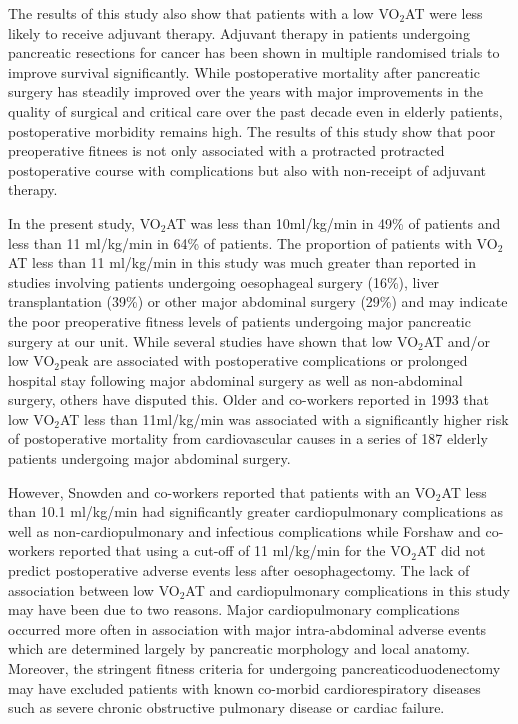 The results of this study also show that patients with a low VO$_2$AT were less likely to receive adjuvant therapy. Adjuvant therapy in patients undergoing pancreatic resections for cancer has been shown in multiple randomised trials to improve survival significantly.\parencite{neoptolemos_randomized_2004, neoptolemos_adjuvant_2009}
While postoperative mortality after pancreatic surgery has steadily improved over the years with major improvements in the quality of surgical and critical care over the past decade\parencite{winter_1423_2006} even in elderly patients\parencite{makary_pancreaticoduodenectomy_2006}, postoperative morbidity remains high.\parencite{mann_review_2010} The results of this study show that poor preoperative fitnees is not only associated with a protracted protracted postoperative course with complications but also with non-receipt of adjuvant therapy.

In the present study, VO$_2$AT was less than 10ml/kg/min in 49\% of patients and less than 11 ml/kg/min in 64\% of patients. The proportion of patients with VO$_2$AT less than 11 ml/kg/min in this study was much greater than reported in studies involving patients undergoing oesophageal surgery (16\%),\parencite{forshaw_is_2008} liver transplantation (39\%)\parencite{epstein_aerobic_2004} or other major abdominal surgery (29\%)\parencite{older_preoperative_1993} and may indicate the poor preoperative fitness levels of patients undergoing major pancreatic surgery at our unit. While several studies have shown that low VO$_2$AT and/or low VO$_2$peak are associated with postoperative complications or prolonged hospital stay following major abdominal surgery as well as non-abdominal surgery,\parencite{older_preoperative_1993, epstein_aerobic_2004, mccullough_cardiorespiratory_2006, nagamatsu_preoperative_2001, older_cardiopulmonary_1999, older_clinical_2004} others have disputed this.\parencite{forshaw_is_2008, clayton_cardiopulmonary_2011, hightower_pilot_2010} Older and co-workers reported in 1993 that low VO$_2$AT less than 11ml/kg/min was associated with a significantly higher risk of postoperative mortality from cardiovascular causes in a series of 187 elderly patients undergoing major abdominal surgery.\parencite{older_preoperative_1993}

However, Snowden and co-workers\parencite{snowden_submaximal_2010} reported that patients with an VO$_2$AT less than 10.1 ml/kg/min had significantly greater cardiopulmonary complications as well as non-cardiopulmonary and infectious complications while Forshaw and co-workers\parencite{forshaw_is_2008} reported that using a cut-off of 11 ml/kg/min for the VO$_2$AT did not predict postoperative adverse events less after oesophagectomy. The lack of association between low VO$_2$AT and cardiopulmonary complications in this study may have been due to two reasons. Major cardiopulmonary complications occurred more often in association with major intra-abdominal adverse events which are determined largely by pancreatic morphology and local anatomy.\parencite{braga_prognostic_2011} Moreover, the stringent fitness criteria for undergoing pancreaticoduodenectomy may have excluded patients with known co-morbid cardiorespiratory diseases such as severe chronic obstructive pulmonary disease or cardiac failure.

